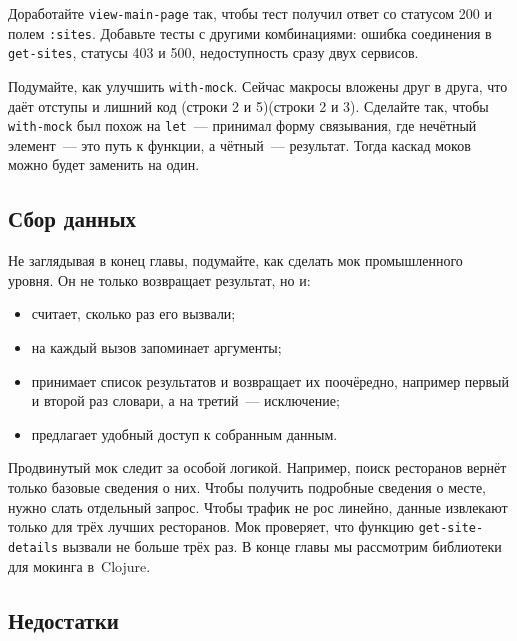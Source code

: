 \fi

Доработайте \verb|view-main-page| так, чтобы тест получил ответ со статусом
200 и полем \verb|:sites|. Добавьте тесты с другими комбинациями: ошибка
соединения в \verb|get-sites|, статусы 403 и 500, недоступность сразу двух
сервисов.

Подумайте, как улучшить \verb|with-mock|. Сейчас макросы вложены друг в друга,
что даёт отступы и лишний код \ifx\DEVICETYPE\MOBILE(строки 2 и 5)\else(строки 2 и 3)\fi. Сделайте так, чтобы
\verb|with-mock| был похож на \verb|let|~--- принимал форму связывания, где
нечётный элемент~--- это путь к функции, а чётный~--- результат. Тогда каскад моков
можно будет заменить на один.

\subsection{Сбор данных}


Не заглядывая в конец главы, подумайте, как сделать мок промышленного уровня. Он
не только возвращает результат, но и:

\begin{itemize}

\item
  считает, сколько раз его вызвали;

\item
  на каждый вызов запоминает аргументы;

\item
  принимает список результатов и возвращает их поочёредно, например первый и
  второй раз словари, а на третий~--- исключение;

\item
  предлагает удобный доступ к собранным данным.

\end{itemize}

Продвинутый мок следит за особой логикой. Например, поиск ресторанов вернёт
только базовые сведения о них. Чтобы получить подробные сведения о месте, нужно
слать отдельный запрос. Чтобы трафик не рос линейно, данные извлекают только для
трёх лучших ресторанов. Мок проверяет, что функцию \verb|get-site-details|
вызвали не больше трёх раз. В конце главы мы рассмотрим библиотеки для мокинга
в~Clojure.

\subsection{Недостатки}

